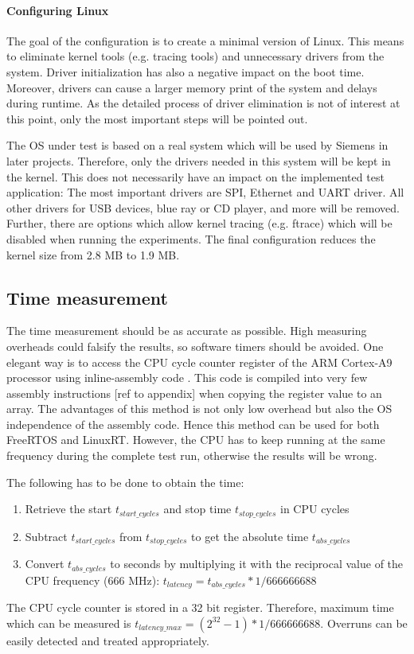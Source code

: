 \paragraph{Configuring Linux}
The goal of the configuration is to create a minimal version of Linux.
This means to eliminate kernel tools (e.g. tracing tools) and unnecessary drivers from the system. 
Driver initialization has also a negative impact on the boot time.
Moreover, drivers can cause a larger memory print of the system and delays during runtime. 
As the detailed process of driver elimination is not of interest at this point, only the most important steps will be pointed out.
\par
The \ac{OS} under test is based on a real system which will be used by Siemens in later projects.
Therefore, only the drivers needed in this system will be kept in the kernel.
This does not necessarily have an impact on the implemented test application:
The most important drivers are \ac{SPI}, Ethernet and \ac{UART} driver.
All other drivers for \ac{USB} devices, blue ray or CD player, and more will be removed.
Further, there are options which allow kernel tracing (e.g. ftrace) which will be disabled when running the experiments.  
The final configuration reduces the kernel size from 2.8 MB to 1.9 MB. 

\subsection{Time measurement}
The time measurement should be as accurate as possible.
High measuring overheads could falsify the results, so software timers should be avoided. 
One elegant way is to access the \ac{CPU} cycle counter register of the ARM Cortex-A9 processor using inline-assembly code \cite{arm:aarmaaae}.
This code is compiled into very few assembly instructions [ref to appendix] when copying the register value to an array.
The advantages of this method is not only low overhead but also the \ac{OS} independence of the assembly code.
Hence this method can be used for both FreeRTOS and LinuxRT.
However, the \ac{CPU} has to keep running at the same frequency during the complete test run, otherwise the results will be wrong.
\par
The following has to be done to obtain the time:
\begin{enumerate}
	\item Retrieve the start $t_{start\_cycles}$ and stop time $t_{stop\_cycles}$ in \ac{CPU} cycles
	\item Subtract $t_{start\_cycles}$ from $t_{stop\_cycles}$ to get the absolute time $t_{abs\_cycles}$
	\item Convert $t_{abs\_cycles}$ to seconds by multiplying it with the reciprocal value of the \ac{CPU} frequency (666 MHz): $t_{latency} = t_{abs\_cycles} * 1/666666688$
\end{enumerate}
The \ac{CPU} cycle counter is stored in a 32 bit register.
Therefore, maximum time which can be measured is $t_{latency\_max} = (2^{32}-1) * 1/666666688 $.
Overruns can be easily detected and treated appropriately. 

